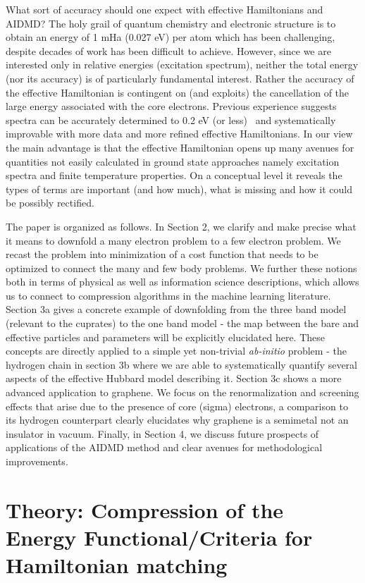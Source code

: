 \documentclass[prl,12pt,onecolumn,nofootinbib,notitlepage,english,superscriptaddress]{revtex4-1}
\newcommand{\HJC}[1]{{\color{RED}{\bf HJC: #1}}}
\begin{document}
What sort of accuracy should one expect with effective Hamiltonians and AIDMD? The holy grail of quantum chemistry 
and electronic structure is to obtain an energy of 1 mHa (0.027 eV) per atom which has been challenging, 
despite decades of work has been difficult to achieve. However, since we are interested only in relative energies (excitation spectrum), 
neither the total energy (nor its accuracy) is of particularly fundamental interest. Rather the accuracy of the 
effective Hamiltonian is contingent on (and exploits) the cancellation of the large energy associated with the core electrons.
Previous experience suggests spectra can be accurately determined to 0.2 eV (or less)~\cite{Changlani2015} and systematically improvable with 
more data and more refined effective Hamiltonians.  In our view the main advantage is that 
the effective Hamiltonian opens up many avenues for quantities not easily calculated in ground state approaches namely excitation spectra 
and finite temperature properties. On a conceptual level it reveals the types of terms are important (and how much), 
what is missing and how it could be possibly rectified. 

The paper is organized as follows. In Section 2, we clarify and make precise what it means to downfold 
a many electron problem to a few electron problem. We recast the problem into minimization 
of a cost function that needs to be optimized to connect the many and few body problems. We further 
these notions both in terms of physical as well as information science descriptions, which allows us to connect to 
compression algorithms in the machine learning literature. Section 3a gives a concrete example of downfolding from 
the three band model (relevant to the cuprates) to the one band model - the map between the bare and 
effective particles and parameters will be explicitly elucidated here. These concepts are directly applied 
to a simple yet non-trivial \emph{ab-initio} problem - the hydrogen chain in section 3b where we are able to 
systematically quantify several aspects of the effective Hubbard model describing it. Section 3c 
shows a more advanced application to graphene. We focus on the renormalization and screening effects that arise 
due to the presence of core (sigma) electrons, a comparison to its hydrogen counterpart clearly 
elucidates why graphene is a semimetal not an insulator in vacuum. 
Finally, in Section 4, we discuss future prospects of applications of the AIDMD method and 
clear avenues for methodological improvements. 

\section{Theory: Compression of the Energy Functional/Criteria for Hamiltonian matching}
\HJC{Lucas handling this section......Look at theory.tex}
\end{document}
